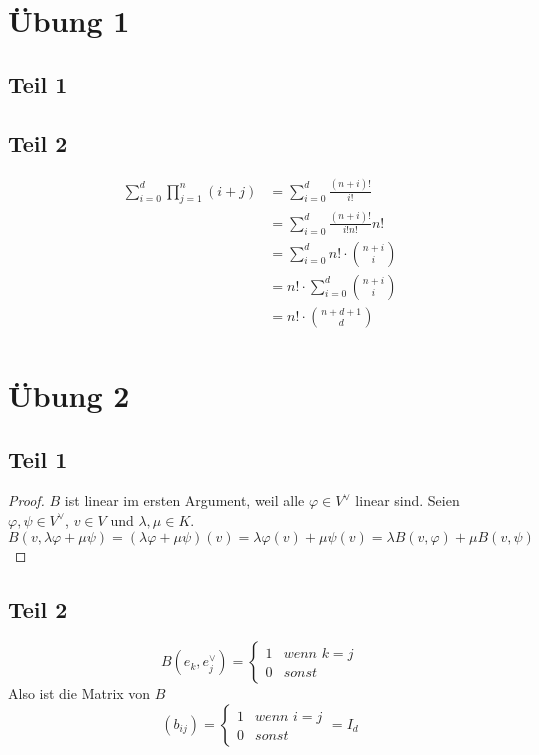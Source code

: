 \documentclass[10pt,a4paper]{article}
\begin{document}
\section*{Übung 1}

\subsection*{Teil 1}

\subsection*{Teil 2}

\begin{align*}
\sum_{i = 0}^{d} \prod_{j = 1}^{n} (i + j) & = \sum_{i = 0}^{d} \frac{(n + i)!}{i!}\\
& = \sum_{i = 0}^{d} \frac{(n + i)!}{i!n!}n!\\
& = \sum_{i = 0}^{d} n! \cdot \binom{n + i}{i}\\
& = n! \cdot \sum_{i = 0}^{d} \binom{n + i}{i}\\
& = n! \cdot \binom{n + d + 1}{d}\\
\end{align*}

\section*{Übung 2}

\subsection*{Teil 1}

\begin{proof}
$B$ ist linear im ersten Argument, weil alle $\varphi \in V^{\vee}$ linear sind.
Seien $\varphi, \psi \in V^{\vee}$, $v \in V$ und $\lambda, \mu \in K$.
\begin{equation}
B(v, \lambda \varphi + \mu \psi) = (\lambda \varphi + \mu \psi)(v) = \lambda \varphi(v) + \mu \psi(v) = \lambda B(v, \varphi) + \mu B(v, \psi)
\end{equation}
\end{proof}

\subsection*{Teil 2}

\begin{equation}
B(e_{k}, e_{j}^{\vee}) = \begin{cases}
1 & \textit{wenn $k = j$}\\
0 & \textit{sonst}
\end{cases}
\end{equation}
Also ist die Matrix von $B$
\begin{equation}
(b_{ij}) = \begin{cases}
1 & \textit{wenn $i = j$}\\
0 & \textit{sonst}
\end{cases}
= I_{d}
\end{equation}
\end{document}
